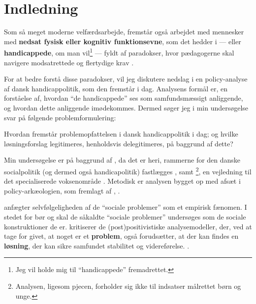 \section{Indledning}

Som så meget moderne velfærdsarbejde, fremstår også arbejdet med mennesker med \textbf{nedsat fysisk eller kognitiv funktionsevne}, som det hedder i  — eller \textbf{handicappede}, om man vil\footnote{Jeg vil holde mig til “handicappede” fremadrettet.} — fyldt af paradokser, hvor pædagogerne skal navigere modsatrettede og flertydige krav \autocite{mik-meyerIndledningSkabeProfessionel2012}.

For at bedre forstå disse paradokser, vil jeg diskutere nedslag i en policy-analyse af dansk handicappolitik, som den fremstår i dag.
Analysens formål er, en forståelse af, hvordan “de handicappede” ses som samfundsmæssigt anliggende, og hvordan dette anliggende imødekommes.
Dermed søger jeg i min undersøgelse svar på følgende problemformulering:

Hvordan fremstår problemopfattelsen i dansk handicappolitik i dag; og hvilke løsningsforslag legitimeres, henholdsvis delegitimeres, på baggrund af dette?

Min undersøgelse er på baggrund af , da det er heri, rammerne for den danske socialpolitik (og dermed også handicapolitik) fastlægges \autocite[kapitel 2]{social-ogindenrigsministerietBekendtgorelseAfLov2019}, samt \footnote{Analysen, ligesom pjecen, forholder sig ikke til indsatser målrettet børn og unge.}, en vejledning til det specialiserede voksenområde \autocite{klStyringAfDet2017}.
Metodisk er analysen bygget op med afsæt i policy-arkæologien, som fremlagt af \citeauthor{scheurichPolicyArchaeologyNew1994}, \citeyear{scheurichPolicyArchaeologyNew1994}.

\citeauthor{scheurichPolicyArchaeologyNew1994} anfægter selvfølgeligheden af de “sociale problemer” som et empirisk fænomen.
I stedet for bør og skal de såkaldte “sociale problemer” undersøges som de sociale konstruktioner de er.
\citeauthor{scheurichPolicyArchaeologyNew1994} kritiserer de (post)positivistiske analysemodeller, der, ved at tage for givet, at noget er et \textbf{problem}, også forudsætter, at der kan findes en \textbf{løsning}, der kan sikre samfundet stabilitet og videreførelse. \autocite[ss. 298-299]{scheurichPolicyArchaeologyNew1994}.

